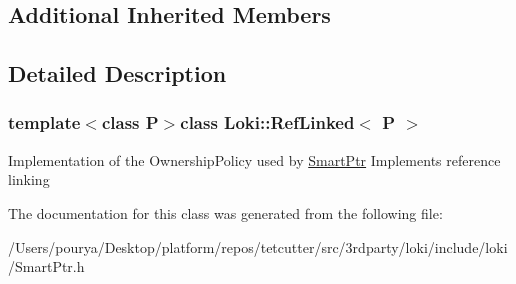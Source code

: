 \subsection*{Additional Inherited Members}


\subsection{Detailed Description}
\subsubsection*{template$<$class P$>$class Loki\+::\+Ref\+Linked$<$ P $>$}

Implementation of the Ownership\+Policy used by \hyperlink{classLoki_1_1SmartPtr}{Smart\+Ptr} Implements reference linking 

The documentation for this class was generated from the following file\+:\begin{DoxyCompactItemize}
\item 
/\+Users/pourya/\+Desktop/platform/repos/tetcutter/src/3rdparty/loki/include/loki/Smart\+Ptr.\+h\end{DoxyCompactItemize}
